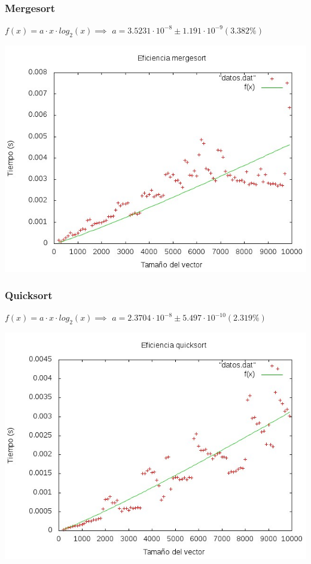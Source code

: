 \documentclass[11pt,spanish]{article} %
\begin{document}
{\ }

\subsubsection{Mergesort}
$ f(x) = a\cdot x\cdot log_2(x) \implies$
$ a               = 3.5231\cdot 10^{-8}       \pm 1.191\cdot 10^{-9}    (3.382\%) $
\begin{center}
\includegraphics[scale=0.55]{../Graficas/Mergesort/mergesortO0_ruben.jpeg}
\end{center}
\newpage

\subsubsection{Quicksort}
$ f(x) = a\cdot x\cdot log_2(x) \implies$
$ a               = 2.3704\cdot 10^{-8}       \pm 5.497\cdot 10^{-10}    (2.319\%) $
\begin{center}
\includegraphics[scale=0.55]{../Graficas/Quicksort/quicksortO0_ruben.jpeg}
\end{center}
\end{document}
